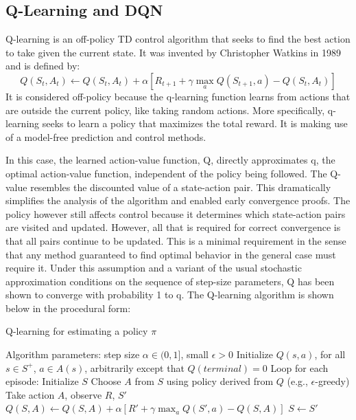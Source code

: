 \documentclass[12pt,a4paper]{article}
\begin{document}
\subsection{Q-Learning and DQN}\label{sec:q-learning}
Q-learning is an off-policy TD control algorithm that seeks to find the best action to take given the current state. It was invented by Christopher Watkins in 1989 and is defined by:
\begin{equation}
    \label{eq:q_learn}
    Q(S_t, A_t) \leftarrow Q(S_t, A_t) + \alpha [R_{t+1}+\gamma \max_aQ(S_{t+1},a)-Q(S_t,A_t)]
\end{equation}
It is considered off-policy because the q-learning function learns from actions that are outside the current policy, like taking random actions. More specifically, q-learning seeks to learn a policy that maximizes the total reward. It is making use of a model-free prediction and control methods.

In this case, the learned action-value function, Q, directly approximates q, the optimal
action-value function, independent of the policy being followed. The Q-value resembles the discounted value of a state-action pair. This dramatically
simplifies the analysis of the algorithm and enabled early convergence proofs. The policy however
still affects control because it determines which state-action pairs are visited and updated.
However, all that is required for correct convergence is that all pairs continue to be
updated. This is a minimal requirement in the sense that
any method guaranteed to find optimal behavior in the general case must require it.
Under this assumption and a variant of the usual stochastic approximation conditions on
the sequence of step-size parameters, Q has been shown to converge with probability 1 to
q. The Q-learning algorithm is shown below in the procedural form\cite{Sutton2015}:
\begin{algorithm}
    \caption{Q-learning for estimating a policy $\pi$}
    \begin{algorithmic}
    \State Algorithm parameters: step size $\alpha \in (0, 1]$, small  $\epsilon > 0$
    \State Initialize $Q(s,a)$, for all $s\in S^+$, $a\in A(s)$, arbitrarily except that $Q(terminal)=0$
    \State Loop for each episode:
        \State Initialize $S$
            \State Choose $A$ from $S$ using policy derived from $Q$ (e.g., $\epsilon$-greedy)
            \State Take action $A$, observe $R$, $S'$
            \State $Q(S, A) \leftarrow Q(S, A) + \alpha [R'+\gamma \max_aQ(S',a)-Q(S,A)]$
            \State $S \leftarrow S'$
        \EndFor
    \EndWhile
    \end{algorithmic}
\end{algorithm}
\end{document}
